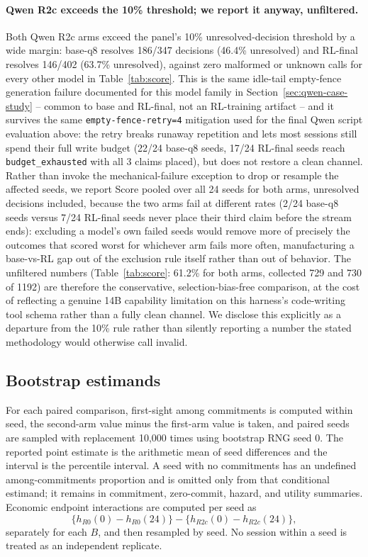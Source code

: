 \documentclass{article}
\begin{document}
\paragraph{Qwen R2c exceeds the 10\% threshold; we report it anyway, unfiltered.}
Both Qwen R2c arms exceed the panel's 10\% unresolved-decision threshold by a
wide margin: base-q8 resolves 186/347 decisions (46.4\% unresolved) and
RL-final resolves 146/402 (63.7\% unresolved), against zero malformed or
unknown calls for every other model in Table~\ref{tab:score}. This is the same
idle-tail empty-fence generation failure documented for this model family in
Section~\ref{sec:qwen-case-study} -- common to base and RL-final, not an
RL-training artifact -- and it survives the same \texttt{empty-fence-retry=4}
mitigation used for the final Qwen script evaluation above: the retry breaks
runaway repetition and lets most sessions still spend their full write budget
(22/24 base-q8 seeds, 17/24 RL-final seeds reach \texttt{budget\_exhausted}
with all 3 claims placed), but does not restore a clean channel. Rather than
invoke the mechanical-failure exception to drop or resample the affected
seeds, we report Score pooled over all 24 seeds for both arms, unresolved
decisions included, because the two arms fail at different rates (2/24
base-q8 seeds versus 7/24 RL-final seeds never place their third claim before
the stream ends): excluding a model's own failed seeds would remove more of
precisely the outcomes that scored worst for whichever arm fails more often,
manufacturing a base-vs-RL gap out of the exclusion rule itself rather than
out of behavior. The unfiltered numbers (Table~\ref{tab:score}: 61.2\% for
both arms, collected 729 and 730 of 1192) are therefore the conservative,
selection-bias-free comparison, at the cost of reflecting a genuine 14B
capability limitation on this harness's code-writing tool schema rather than
a fully clean channel. We disclose this explicitly as a departure from the
10\% rule rather than silently reporting a number the stated methodology
would otherwise call invalid.

\subsection{Bootstrap estimands}
\label{app:bootstrap}

For each paired comparison, first-sight among commitments is computed within
seed, the second-arm value minus the first-arm value is taken, and paired seeds
are sampled with replacement 10,000 times using bootstrap RNG seed 0. The
reported point estimate is the arithmetic mean of seed differences and the
interval is the percentile interval. A seed with no commitments has an
undefined among-commitments proportion and is omitted only from that
conditional estimand; it remains in commitment, zero-commit, hazard, and
utility summaries. Economic endpoint interactions are computed per seed as
\[
\{h_{R0}(0)-h_{R0}(24)\}
-\{h_{R2c}(0)-h_{R2c}(24)\},
\]
separately for each $B$, and then resampled by seed. No session within a seed
is treated as an independent replicate.
\end{document}
